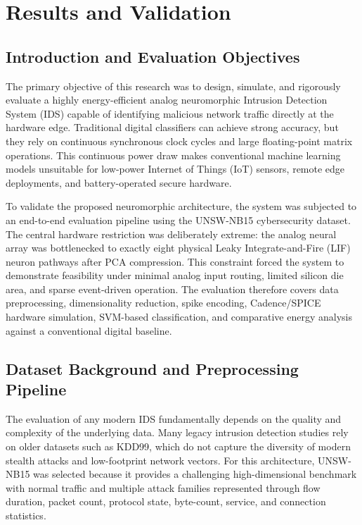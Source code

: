 \documentclass{ieeeaccess}
\begin{document}
\section{Results and Validation}

\subsection{Introduction and Evaluation Objectives}
The primary objective of this research was to design, simulate, and rigorously evaluate a highly energy-efficient analog neuromorphic Intrusion Detection System (IDS) capable of identifying malicious network traffic directly at the hardware edge. Traditional digital classifiers can achieve strong accuracy, but they rely on continuous synchronous clock cycles and large floating-point matrix operations. This continuous power draw makes conventional machine learning models unsuitable for low-power Internet of Things (IoT) sensors, remote edge deployments, and battery-operated secure hardware.

To validate the proposed neuromorphic architecture, the system was subjected to an end-to-end evaluation pipeline using the UNSW-NB15 cybersecurity dataset. The central hardware restriction was deliberately extreme: the analog neural array was bottlenecked to exactly eight physical Leaky Integrate-and-Fire (LIF) neuron pathways after PCA compression. This constraint forced the system to demonstrate feasibility under minimal analog input routing, limited silicon die area, and sparse event-driven operation. The evaluation therefore covers data preprocessing, dimensionality reduction, spike encoding, Cadence/SPICE hardware simulation, SVM-based classification, and comparative energy analysis against a conventional digital baseline.

\subsection{Dataset Background and Preprocessing Pipeline}
The evaluation of any modern IDS fundamentally depends on the quality and complexity of the underlying data. Many legacy intrusion detection studies rely on older datasets such as KDD99, which do not capture the diversity of modern stealth attacks and low-footprint network vectors. For this architecture, UNSW-NB15 was selected because it provides a challenging high-dimensional benchmark with normal traffic and multiple attack families represented through flow duration, packet count, protocol state, byte-count, service, and connection statistics.
\end{document}
